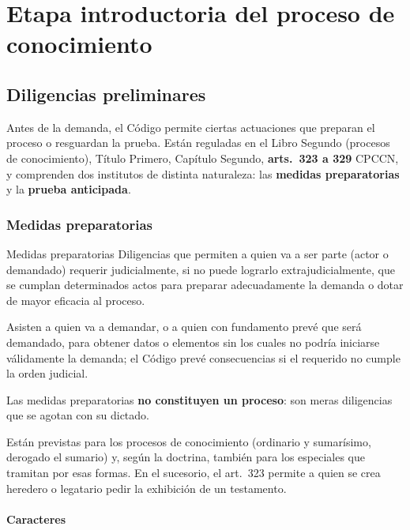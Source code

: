 \documentclass[12pt,oneside]{book}
\begin{document}
\part{Etapa introductoria del proceso de conocimiento}\label{pt:introductoria}

\chapter{Diligencias preliminares}
\label{cap:diligencias}

Antes de la demanda, el Código permite ciertas actuaciones que preparan el proceso o resguardan la prueba. Están reguladas en el Libro Segundo (procesos de conocimiento), Título Primero, Capítulo Segundo, \textbf{arts.~323 a 329} CPCCN, y comprenden dos institutos de distinta naturaleza: las \textbf{medidas preparatorias} y la \textbf{prueba anticipada}.

\section{Medidas preparatorias}

\begin{definition}{Medidas preparatorias}
Diligencias que permiten a quien va a ser parte (actor o demandado) requerir judicialmente, si no puede lograrlo extrajudicialmente, que se cumplan determinados actos para preparar adecuadamente la demanda o dotar de mayor eficacia al proceso.
\end{definition}

Asisten a quien va a demandar, o a quien con fundamento prevé que será demandado, para obtener datos o elementos sin los cuales no podría iniciarse válidamente la demanda; el Código prevé consecuencias si el requerido no cumple la orden judicial.

\begin{important}
Las medidas preparatorias \textbf{no constituyen un proceso}: son meras diligencias que se agotan con su dictado.
\end{important}

Están previstas para los procesos de conocimiento (ordinario y sumarísimo, derogado el sumario) y, según la doctrina, también para los especiales que tramitan por esas formas. En el sucesorio, el art.~323 permite a quien se crea heredero o legatario pedir la exhibición de un testamento.

\subsection{Caracteres}
\end{document}
